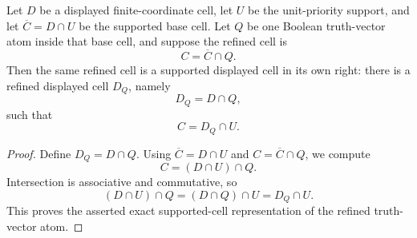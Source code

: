 \begin{helper}
Let \(D\) be a displayed finite-coordinate cell, let \(U\) be the unit-priority
support, and let \(\overline C=D\cap U\) be the supported base cell.  Let
\(Q\) be one Boolean truth-vector atom inside that base cell, and suppose the
refined cell is
\[
C=\overline C\cap Q.
\]
Then the same refined cell is a supported displayed cell in its own right:
there is a refined displayed cell \(D_Q\), namely
\[
D_Q=D\cap Q,
\]
such that
\[
C=D_Q\cap U.
\]
\end{helper}
\begin{proof}
Define \(D_Q=D\cap Q\).  Using \(\overline C=D\cap U\) and
\(C=\overline C\cap Q\), we compute
\[
C=(D\cap U)\cap Q.
\]
Intersection is associative and commutative, so
\[
(D\cap U)\cap Q=(D\cap Q)\cap U=D_Q\cap U.
\]
This proves the asserted exact supported-cell representation of the refined
truth-vector atom.
\end{proof}
